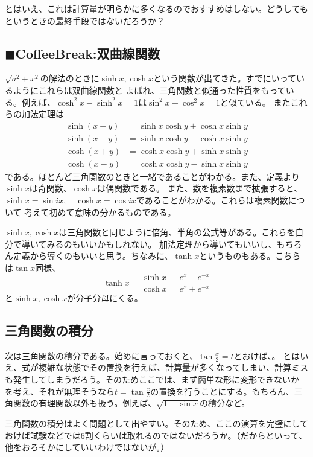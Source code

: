 \documentclass[a4j,dvipdfmx]{jsarticle}
\begin{document}
とはいえ、これは計算量が明らかに多くなるのでおすすめはしない。どうしてもというときの最終手段ではないだろうか？\\
\hrulefill
\subsection{$\blacksquare$CoffeeBreak:双曲線関数}
\begin{screen}
    $\sqrt{a^2+x^2}$の解法のときに$\sinh x,\cosh x$という関数が出てきた。すでにいっているようにこれらは双曲線関数と
    よばれ、三角関数と似通った性質をもっている。例えば、$\cosh^2 x-\sinh^2 x=1$は$\sin^2 x+\cos^2 x=1$と似ている。
    またこれらの加法定理は
    \begin{align*}
        \sinh(x+y)&=\sinh x\cosh y+\cosh x\sinh y\\
        \sinh(x-y)&=\sinh x\cosh y-\cosh x\sinh y\\
        \cosh(x+y)&=\cosh x\cosh y+\sinh x\sinh y\\
        \cosh(x-y)&=\cosh x\cosh y-\sinh x\sinh y
    \end{align*}
    である。ほとんど三角関数のときと一緒であることがわかる。また、定義より$\sinh x$は奇関数、$\cosh x$は偶関数である。
    また、数を複素数まで拡張すると、$\sinh x=\sin ix,\quad \cosh x=\cos ix$であることがわかる。これらは複素関数について
    考えて初めて意味の分かるものである。

    $\sinh x,\cosh x$は三角関数と同じように倍角、半角の公式等がある。これらを自分で導いてみるのもいいかもしれない。
    加法定理から導いてもいいし、もちろん定義から導くのもいいと思う。ちなみに、$\tanh x$というものもある。こちらは$\tan x$同様、
    \begin{equation*}
        \tanh x=\frac{\sinh x}{\cosh x}=\frac{e^x-e^{-x}}{e^x+e^{-x}}
    \end{equation*}
    と$\sinh x,\cosh x$が分子分母にくる。
\end{screen}
\newpage
\subsection{三角関数の積分}
次は三角関数の積分である。始めに言っておくと、$\tan\frac{x}{2}=t$とおけば、。
とはいえ、式が複雑な状態でその置換を行えば、計算量が多くなってしまい、計算ミスも発生してしまうだろう。そのためここでは、まず簡単な形に変形できないか
を考え、それが無理そうなら$t=\tan\frac{x}{2}$の置換を行うことにする。もちろん、三角関数の有理関数以外も扱う。例えば、$\sqrt{1-\sin x}$の積分など。

三角関数の積分はよく問題として出やすい。そのため、ここの演算を完璧にしておけば試験などでは6割くらいは取れるのではないだろうか。（だからといって、他をおろそかにしていいわけではないが。）
\end{document}
